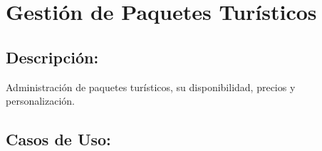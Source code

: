 



\section{Gesti\'on de Paquetes Tur\'isticos}

\subsection*{Descripci\'on:}
Administraci\'on de paquetes tur\'isticos, su disponibilidad, precios y personalizaci\'on.

\subsection*{Casos de Uso:}

